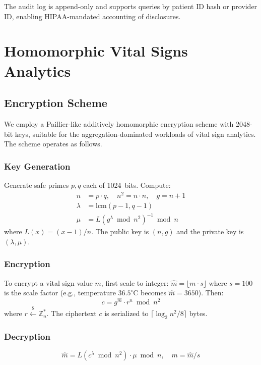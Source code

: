 \documentclass[conference,10pt]{IEEEtran}
\begin{document}
The audit log is append-only and supports queries by patient ID hash or provider ID, enabling HIPAA-mandated accounting of disclosures.

\section{Homomorphic Vital Signs Analytics}
\label{sec:he}

\subsection{Encryption Scheme}

We employ a Paillier-like additively homomorphic encryption scheme with 2048-bit keys, suitable for the aggregation-dominated workloads of vital sign analytics. The scheme operates as follows.

\subsubsection{Key Generation}
Generate safe primes $p, q$ each of 1024~bits. Compute:
\begin{align}
n &= p \cdot q, \quad n^2 = n \cdot n, \quad g = n + 1 \\
\lambda &= \text{lcm}(p-1, q-1) \\
\mu &= L(g^\lambda \bmod n^2)^{-1} \bmod n
\end{align}
where $L(x) = (x - 1) / n$. The public key is $(n, g)$ and the private key is $(\lambda, \mu)$.

\subsubsection{Encryption}
To encrypt a vital sign value $m$, first scale to integer: $\hat{m} = \lfloor m \cdot s \rfloor$ where $s = 100$ is the scale factor (e.g., temperature $36.5^\circ$C becomes $\hat{m} = 3650$). Then:
\begin{equation}
\label{eq:paillier_enc}
c = g^{\hat{m}} \cdot r^n \bmod n^2
\end{equation}
where $r \xleftarrow{\$} \mathbb{Z}_n^*$. The ciphertext $c$ is serialized to $\lceil \log_2 n^2 / 8 \rceil$ bytes.

\subsubsection{Decryption}
\begin{equation}
\hat{m} = L(c^\lambda \bmod n^2) \cdot \mu \bmod n, \quad m = \hat{m} / s
\end{equation}
\end{document}
